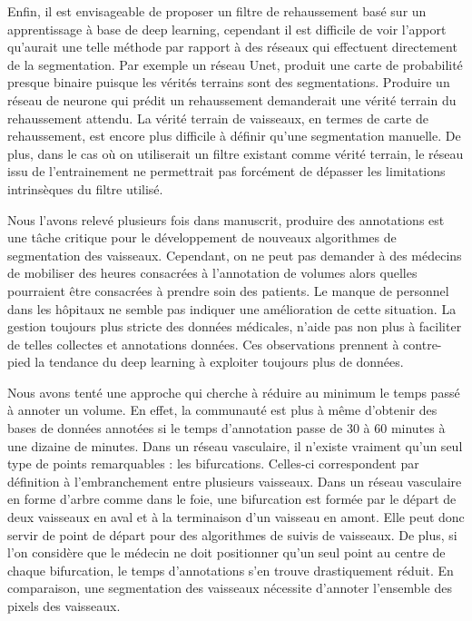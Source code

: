 Enfin, il est envisageable de proposer un filtre de rehaussement basé sur un apprentissage à base de deep learning, cependant il est difficile de voir l'apport qu'aurait une telle méthode par rapport à des réseaux qui effectuent directement de la segmentation. Par exemple un réseau Unet, produit une carte de probabilité presque binaire puisque les vérités terrains sont des segmentations. Produire un réseau de neurone qui prédit un rehaussement demanderait une vérité terrain du rehaussement attendu. La vérité terrain de vaisseaux, en termes de carte de rehaussement, est encore plus difficile à définir qu'une segmentation manuelle. De plus, dans le cas où on utiliserait un filtre existant comme vérité terrain, le réseau issu de l'entrainement ne permettrait pas forcément de dépasser les limitations intrinsèques du filtre utilisé.

Nous l'avons relevé plusieurs fois dans manuscrit, produire des annotations est une tâche critique pour le développement de nouveaux algorithmes de segmentation des vaisseaux. Cependant, on ne peut pas demander à des médecins de mobiliser des heures consacrées à l'annotation de volumes alors quelles pourraient être consacrées à prendre soin des patients. Le manque de personnel dans les hôpitaux ne semble pas indiquer une amélioration de cette situation. La gestion toujours plus stricte des données médicales, n'aide pas non plus à faciliter de telles collectes et annotations données. Ces observations prennent à contre-pied la tendance du deep learning à exploiter toujours plus de données.

Nous avons tenté une approche qui cherche à réduire au minimum le temps passé à annoter un volume. En effet, la communauté est plus à même d'obtenir des bases de données annotées si le temps d'annotation passe de 30 à 60 minutes à une dizaine de minutes. Dans un réseau vasculaire, il n'existe vraiment qu'un seul type de points remarquables : les bifurcations. Celles-ci correspondent par définition à l'embranchement entre plusieurs vaisseaux. Dans un réseau vasculaire en forme d'arbre comme dans le foie, une bifurcation est formée par le départ de deux vaisseaux en aval et à la terminaison d'un vaisseau en amont. Elle peut donc servir de point de départ pour des algorithmes de suivis de vaisseaux. De plus, si l'on considère que le médecin ne doit positionner qu'un seul point au centre de chaque bifurcation, le temps d'annotations s'en trouve drastiquement réduit. En comparaison, une segmentation des vaisseaux nécessite d'annoter l'ensemble des pixels des vaisseaux.
 
